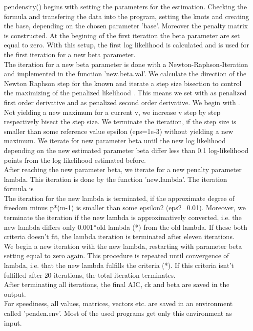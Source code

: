 \begin{Details}\relax
pendensity() begins with setting the parameters for the estimation. Checking the formula and transfering the data into the program, setting the knots and creating the base, depending on the chosen parameter 'base'. Moreover the penalty matrix is constructed. At the begining of the first iteration the beta parameter are set equal to zero. With this setup, the first log likelihood is calculated and is used for the first iteration for a new beta parameter.\\
The iteration for a new beta parameter is done with a Newton-Raphson-Iteration and implemented in the function 'new.beta.val'. We calculate the direction of the Newton Raphson step for the known  and iterate a step size bisection to control the maximizing of the penalized likelihood . This means we set  with  as penalized first order derivative and  as penalized second order derivative. We begin with . Not yielding a new maximum for a current v, we increase v step by step respectively bisect the step size. We terminate the iteration, if the step size is smaller than some reference value epsilon (eps=1e-3) without yielding a new maximum. We iterate for new parameter beta until the new log likelihood depending on the new estimated parameter beta differ less than 0.1 log-likelihood points from the log likelihood estimated before.\\
After reaching the new parameter beta, we iterate for a new penalty parameter lambda. This iteration is done by the function 'new.lambda'. The iteration formula is \\
The iteration for the new lambda is terminated, if the approximate degree of freedom minus p*(m-1) is smaller than some epsilon2 (eps2=0.01). Moreover, we terminate the iteration if the new lambda is approximatively converted, i.e. the new lambda differs only 0.001*old lambda (*) from the old lambda. If these both criteria doesn't fit, the lambda iteration is terminated after eleven iterations. \\
We begin a new iteration with the new lambda, restarting with parameter beta setting equal to zero again. This procedure is repeated until convergence of lambda, i.e. that the new lambda fulfills the criteria (*). If this criteria isnt't fulfilled after 20 iterations, the total iteration terminates.\\
After terminating all iterations, the final AIC, ck and beta are saved in the output.\\
For speediness, all values, matrices, vectors etc. are saved in an environment called 'penden.env'. Most of the used programs get only this environment as input.
\end{Details}
